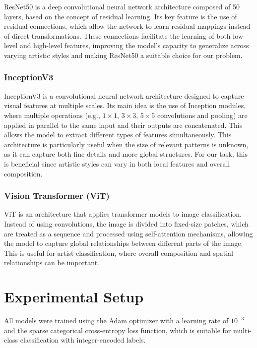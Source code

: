 \documentclass[12pt,a4paper]{article}
\begin{document}
ResNet50 is a deep convolutional neural network architecture composed of 50 layers, based on the concept of residual learning. 
Its key feature is the use of residual connections, which allow the network to learn residual mappings instead of direct transformations. 
These connections facilitate the learning of both low-level and high-level features, improving the model’s capacity to generalize across varying artistic styles and making ResNet50 a suitable choice for our problem.


\subsubsection{InceptionV3}

InceptionV3 is a convolutional neural network architecture designed to capture visual features at multiple scales. 
Its main idea is the use of Inception modules, where multiple operations (e.g., $1 \times 1$, $3 \times 3$, $5 \times 5$ convolutions and pooling) are applied in parallel to the same input and their outputs are concatenated. 
This allows the model to extract different types of features simultaneously.
This architecture is particularly useful when the size of relevant patterns is unknown, as it can capture both fine details and more global structures. 
For our task, this is beneficial since artistic styles can vary in both local features and overall composition.


\subsubsection{Vision Transformer (ViT)}

ViT is an architecture that applies transformer models to image classification. 
Instead of using convolutions, the image is divided into fixed-size patches, which are treated as a sequence and processed using self-attention mechanisms, allowing the model to capture global relationships between different parts of the image.
This is useful for artist classification, where overall composition and spatial relationships can be important.


\section{Experimental Setup}

All models were trained using the Adam optimizer with a learning rate of $10^{-3}$ and the sparse categorical cross-entropy loss function, which is suitable for multi-class classification with integer-encoded labels.
\end{document}
